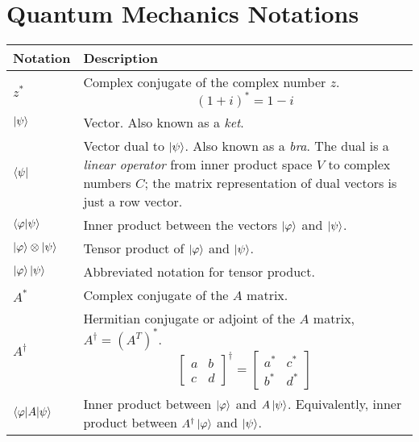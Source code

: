 \documentclass[letterpaper]{article}
\theoremstyle{definition}
\begin{document}
\section{Quantum Mechanics Notations}
\begin{center}
\begin{tabular}{ |p{2cm}|p{8cm}| }
\hline
Notation & Description \\
\hline
$z^{*}$ & Complex conjugate of the complex number $z$. $$(1 + i)^{*} = 1 - i$$ \\
\hline
$\ket{\psi}$ & Vector. Also known as a \textit{ket}. \\
\hline
$\bra{\psi}$ & Vector dual to $\ket{\psi}$. Also known as a \textit{bra}. The dual is a \textit{linear operator} from inner product space $V$ to complex numbers $C$; the matrix representation of dual vectors is just a row vector. \\
\hline
$\braket{\varphi | \psi}$ & Inner product between the vectors $\ket{\varphi}$ and $\ket{\psi}$. \\
\hline 
$\ket{\varphi} \otimes \ket{\psi}$ & Tensor product of $\ket{\varphi}$ and $\ket{\psi}$. \\
\hline 
$\ket{\varphi} \ket{\psi}$ & Abbreviated notation for tensor product. \\
\hline 
$A^{*}$ & Complex conjugate of the $A$ matrix. \\
\hline 
$A^{\dagger}$ & Hermitian conjugate or adjoint of the $A$ matrix, $A^{\dagger} = (A^{T})^{*}$. $$\begin{bmatrix}
a & b \\
c & d
\end{bmatrix}^{\dagger} = \begin{bmatrix}
a^{*} & c^{*} \\
b^{*} & d^{*}
\end{bmatrix}$$ \\ 
\hline
$\braket{\varphi | A | \psi}$ & Inner product between $\ket{\varphi}$ and $A\ket{\psi}$. Equivalently, inner product between $A^{\dagger} \ket{\varphi}$ and $\ket{\psi}$. \\
\hline
\end{tabular}
\end{center}
\end{document}
